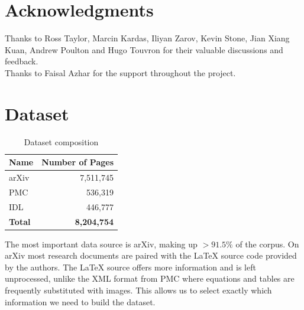 \documentclass[]{article}
\begin{document}
\section{Acknowledgments}
Thanks to Ross Taylor, Marcin Kardas, Iliyan Zarov, Kevin Stone, Jian Xiang Kuan, Andrew Poulton and Hugo Touvron for their valuable discussions and feedback.
\\Thanks to Faisal Azhar for the support throughout the project.


\clearpage
\appendix
\addappheadtotoc
{}
\section{Dataset}

\begin{table}[h!]
    \centering
    \begin{tabular}{l r}\toprule
        Name & Number of Pages \\ \midrule
        arXiv &  7,511,745 \\
        PMC & 536,319 \\
        IDL & 446,777 \\ \midrule
        {\bf Total} & \bf 8,204,754 \\ \bottomrule
    \end{tabular}
    \caption{Dataset composition}
    \label{tab:dataset_composition}
\end{table}

The most important data source is arXiv, making up $>91.5\%$ of the corpus. %
On arXiv most research documents are paired with the LaTeX source code provided by the authors. The LaTeX source offers more information and is left unprocessed, unlike the XML format from PMC where equations and tables are frequently substituted with images. This allows us to select exactly which information we need to build the dataset.
\end{document}
